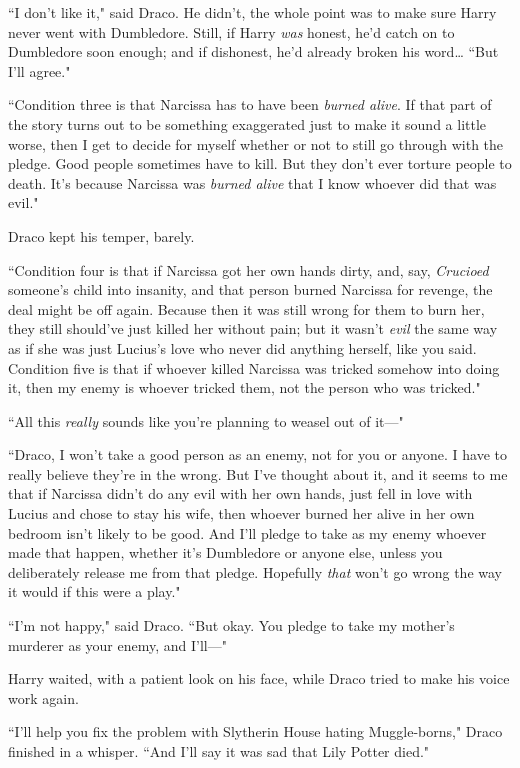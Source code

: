 ``I don't like it," said Draco. He didn't, the whole point was to make sure Harry never went with Dumbledore. Still, if Harry \emph{was} honest, he'd catch on to Dumbledore soon enough; and if dishonest, he'd already broken his word{\ldots} ``But I'll agree."

``Condition three is that Narcissa has to have been \emph{burned alive}. If that part of the story turns out to be something exaggerated just to make it sound a little worse, then I get to decide for myself whether or not to still go through with the pledge. Good people sometimes have to kill. But they don't ever torture people to death. It's because Narcissa was \emph{burned alive} that I know whoever did that was evil."

Draco kept his temper, barely.

``Condition four is that if Narcissa got her own hands dirty, and, say, \emph{Crucioed} someone's child into insanity, and that person burned Narcissa for revenge, the deal might be off again. Because then it was still wrong for them to burn her, they still should've just killed her without pain; but it wasn't \emph{evil} the same way as if she was just Lucius's love who never did anything herself, like you said. Condition five is that if whoever killed Narcissa was tricked somehow into doing it, then my enemy is whoever tricked them, not the person who was tricked."

``All this \emph{really} sounds like you're planning to weasel out of it—"

``Draco, I won't take a good person as an enemy, not for you or anyone. I have to really believe they're in the wrong. But I've thought about it, and it seems to me that if Narcissa didn't do any evil with her own hands, just fell in love with Lucius and chose to stay his wife, then whoever burned her alive in her own bedroom isn't likely to be good. And I'll pledge to take as my enemy whoever made that happen, whether it's Dumbledore or anyone else, unless you deliberately release me from that pledge. Hopefully \emph{that} won't go wrong the way it would if this were a play."

``I'm not happy," said Draco. ``But okay. You pledge to take my mother's murderer as your enemy, and I'll—"

Harry waited, with a patient look on his face, while Draco tried to make his voice work again.

``I'll help you fix the problem with Slytherin House hating Muggle-borns," Draco finished in a whisper. ``And I'll say it was sad that Lily Potter died."


